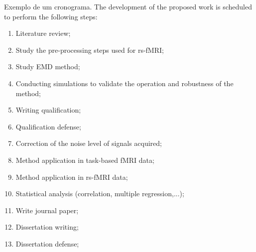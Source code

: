 \documentclass[11pt]{article}
\begin{document}
Exemplo de um cronograma.
The development of the proposed work is scheduled to perform the following steps:

\begin{enumerate}
 \item Literature review;
 \item Study the pre-processing steps used for rs-fMRI;
 \item Study EMD method;
 \item Conducting simulations to validate the operation and robustness of the method;
 \item Writing qualification;
 \item Qualification defense;
 \item Correction of the noise level of signals acquired;
 \item Method application in task-based fMRI data;
 \item Method application in rs-fMRI data;
 \item Statistical analysis (correlation, multiple regression,...);
 \item Write journal paper;
 \item Dissertation writing;
 \item Dissertation defense;
\end{enumerate}

\end{document}
